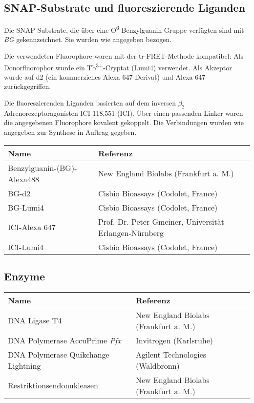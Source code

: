 \subsection{SNAP-Substrate und fluoreszierende Liganden} \label{substrate}

Die SNAP-Substrate, die über eine O\textsuperscript{6}-Benzylguanin-Gruppe verfügten sind mit \textit{BG} gekennzeichnet. Sie wurden wie angegeben bezogen.

Die verwendeten Fluorophore waren mit der tr-FRET-Methode kompatibel: Als Donorfluorophor wurde ein Tb\textsuperscript{3+}-Cryptat (Lumi4) verwendet.  Als Akzeptor wurde auf d2 (ein kommerzielles Alexa 647-Derivat) und Alexa 647 zurückgegriffen.

Die fluoreszierenden Liganden basierten auf dem inversen $\beta_2$\-Adrenorezeptoragonisten ICI-118,551 (ICI). Über einen passenden Linker waren die angegebenen Fluorophore kovalent gekoppelt. Die Verbindungen wurden wie angegeben zur Synthese in Auftrag gegeben.

\begin{table}[htsb]
\begin{tabular}{lll}
\toprule
Name							&	Referenz\\
\midrule
Benzylguanin-(BG)-Alexa488						&	New England Biolabs (Frankfurt a. M.)\\
BG-d2							&	Cisbio Bioassays (Codolet, France)\\
BG-Lumi4						&	Cisbio Bioassays (Codolet, France)\\
\midrule
ICI-Alexa 647					&	Prof. Dr. Peter Gmeiner, Universität Erlangen-Nürnberg\\
ICI-Lumi4						& 	Cisbio Bioassays (Codolet, France)\\
\bottomrule
\end {tabular}
\end{table}

\subsection{Enzyme}

\begin{tabularx}{\textwidth}{lll}
\toprule
Name							&	Referenz\\
\midrule
DNA Ligase T4							&	New England Biolabs (Frankfurt a. M.)\\
DNA Polymerase AccuPrime \textit{Pfx}	&	Invitrogen (Karlsruhe)\\
DNA Polymerase Quikchange Lightning		&	Agilent Technologies (Waldbronn)\\
Restriktionsendonukleasen				&	New England Biolabs (Frankfurt a. M.)\\
\bottomrule
		
\end {tabularx}


